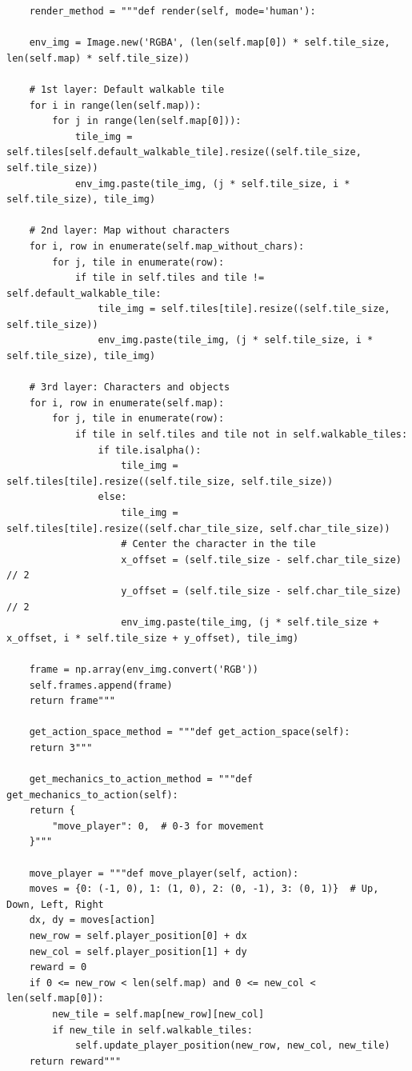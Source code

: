 \documentclass{article} %
\begin{document}
\begin{lstlisting}
    render_method = """def render(self, mode='human'):

    env_img = Image.new('RGBA', (len(self.map[0]) * self.tile_size, len(self.map) * self.tile_size))

    # 1st layer: Default walkable tile
    for i in range(len(self.map)):
        for j in range(len(self.map[0])):
            tile_img = self.tiles[self.default_walkable_tile].resize((self.tile_size, self.tile_size))
            env_img.paste(tile_img, (j * self.tile_size, i * self.tile_size), tile_img)
    
    # 2nd layer: Map without characters
    for i, row in enumerate(self.map_without_chars):
        for j, tile in enumerate(row):
            if tile in self.tiles and tile != self.default_walkable_tile:
                tile_img = self.tiles[tile].resize((self.tile_size, self.tile_size))
                env_img.paste(tile_img, (j * self.tile_size, i * self.tile_size), tile_img)
    
    # 3rd layer: Characters and objects
    for i, row in enumerate(self.map):
        for j, tile in enumerate(row):
            if tile in self.tiles and tile not in self.walkable_tiles:
                if tile.isalpha():
                    tile_img = self.tiles[tile].resize((self.tile_size, self.tile_size))
                else:
                    tile_img = self.tiles[tile].resize((self.char_tile_size, self.char_tile_size))
                    # Center the character in the tile
                    x_offset = (self.tile_size - self.char_tile_size) // 2
                    y_offset = (self.tile_size - self.char_tile_size) // 2
                    env_img.paste(tile_img, (j * self.tile_size + x_offset, i * self.tile_size + y_offset), tile_img)
    
    frame = np.array(env_img.convert('RGB'))
    self.frames.append(frame)
    return frame"""

    get_action_space_method = """def get_action_space(self):
    return 3"""

    get_mechanics_to_action_method = """def get_mechanics_to_action(self):
    return {
        "move_player": 0,  # 0-3 for movement
    }"""

    move_player = """def move_player(self, action):
    moves = {0: (-1, 0), 1: (1, 0), 2: (0, -1), 3: (0, 1)}  # Up, Down, Left, Right
    dx, dy = moves[action]
    new_row = self.player_position[0] + dx
    new_col = self.player_position[1] + dy
    reward = 0
    if 0 <= new_row < len(self.map) and 0 <= new_col < len(self.map[0]):
        new_tile = self.map[new_row][new_col]
        if new_tile in self.walkable_tiles:
            self.update_player_position(new_row, new_col, new_tile)
    return reward"""


\end{lstlisting}
\end{document}
